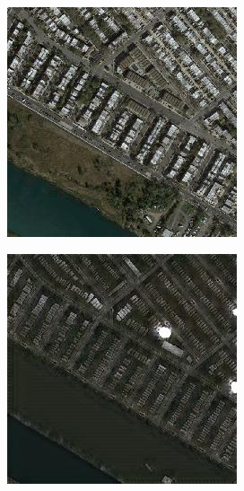 \begin{figure}
  \medskip

  \begin{subfigure}[t]{.14\textwidth}
    \centering
    \includegraphics[width=\linewidth]{images/cycleGanResults/Satelite6_Or_Ld120_E100_Lr0002.jpg}
  \end{subfigure}
  \begin{subfigure}[t]{.14\textwidth}
    \centering
    \includegraphics[width=\linewidth]{images/cycleGanResults/Satelite6Ld120_E100_Lr0002.jpg}

\end{subfigure}
\end{figure}
